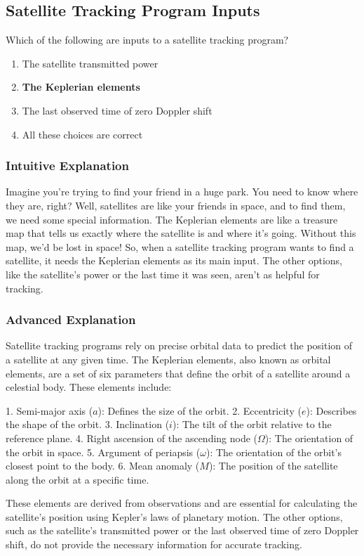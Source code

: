 \subsection{Satellite Tracking Program Inputs}
\label{T8B06}

\begin{tcolorbox}[colback=gray!10!white,colframe=black!75!black,title=T8B06]
Which of the following are inputs to a satellite tracking program?
\begin{enumerate}[label=\Alph*]
    \item The satellite transmitted power
    \item \textbf{The Keplerian elements}
    \item The last observed time of zero Doppler shift
    \item All these choices are correct
\end{enumerate}
\end{tcolorbox}

\subsubsection{Intuitive Explanation}
Imagine you’re trying to find your friend in a huge park. You need to know where they are, right? Well, satellites are like your friends in space, and to find them, we need some special information. The Keplerian elements are like a treasure map that tells us exactly where the satellite is and where it’s going. Without this map, we’d be lost in space! So, when a satellite tracking program wants to find a satellite, it needs the Keplerian elements as its main input. The other options, like the satellite’s power or the last time it was seen, aren’t as helpful for tracking.

\subsubsection{Advanced Explanation}
Satellite tracking programs rely on precise orbital data to predict the position of a satellite at any given time. The Keplerian elements, also known as orbital elements, are a set of six parameters that define the orbit of a satellite around a celestial body. These elements include:

1. Semi-major axis ($a$): Defines the size of the orbit.
2. Eccentricity ($e$): Describes the shape of the orbit.
3. Inclination ($i$): The tilt of the orbit relative to the reference plane.
4. Right ascension of the ascending node ($\Omega$): The orientation of the orbit in space.
5. Argument of periapsis ($\omega$): The orientation of the orbit’s closest point to the body.
6. Mean anomaly ($M$): The position of the satellite along the orbit at a specific time.

These elements are derived from observations and are essential for calculating the satellite’s position using Kepler’s laws of planetary motion. The other options, such as the satellite’s transmitted power or the last observed time of zero Doppler shift, do not provide the necessary information for accurate tracking.

